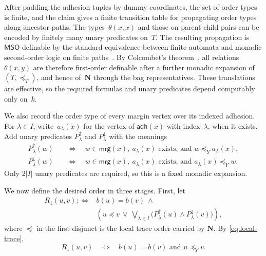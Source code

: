 \documentclass[1p,number,11pt]{elsarticle}
\theoremstyle{plain}
\newcommand{\mrg}{\mathsf{mrg}}
\newcommand{\adh}{\mathsf{adh}}
\newcommand{\MSO}{\ensuremath{\mathsf{MSO}}}
\begin{document}
After padding the adhesion tuples by dummy coordinates, the set of order types is
finite, and the claim gives a finite transition table for propagating order types
along ancestor paths. 
The types~$\theta(x,x)$ and those on parent-child
pairs can be encoded by finitely many unary predicates on~$T$.  The resulting
propagation is $\MSO$-definable by the standard equivalence between finite
automata and monadic second-order logic on finite
paths~\cite{ThatcherWright1968,Doner1970,Thomas1997}.  By
Colcombet's theorem~\cite[Theorem~2]{Colcombet2007}, all relations~$\theta(x,y)$ are therefore first-order definable after a further monadic
expansion of~$(T,\preceq_T)$, and hence of~$\mathbf N$ through the bag
representatives.  These translations are effective, so the required formulas
and unary predicates depend computably only on~$k$.

We also record the order type of every margin vertex over its indexed
adhesion.  For $\lambda\in I$, write~$a_\lambda(x)$ for the vertex of
$\adh(x)$ with index~$\lambda$, when it exists.  Add unary predicates
$P^\uparrow_\lambda$ and $P^\downarrow_\lambda$ with the meanings
\[
\begin{aligned}
P^\uparrow_\lambda(w)
&\quad\Longleftrightarrow\quad
w\in\mrg(x),\ a_\lambda(x)\text{ exists, and }
w\preceq_Ya_\lambda(x),\\
P^\downarrow_\lambda(w)
&\quad\Longleftrightarrow\quad
w\in\mrg(x),\ a_\lambda(x)\text{ exists, and }
a_\lambda(x)\preceq_Yw.
\end{aligned}
\]
Only $2|I|$ unary predicates are required, so this is a fixed monadic
expansion.

We now define the desired order in three stages.
First, let
\[
\begin{split}
 R_1(u,v):\Longleftrightarrow{}& b(u)=b(v)\ \wedge\\
 &\left(
 u\preceq v
 \ \lor\
 \bigvee_{\lambda\in I}
 \bigl(P^\uparrow_\lambda(u)\wedge
       P^\downarrow_\lambda(v)\bigr)
 \right),
\end{split}
\]
where $\preceq$ in the first disjunct is the local trace order carried by $\mathbf N$.
By \eqref{eq:local-trace},
\[
 R_1(u,v)
 \quad\Longleftrightarrow\quad
 b(u)=b(v)\text{ and }u\preceq_Yv.
\]
\end{document}
